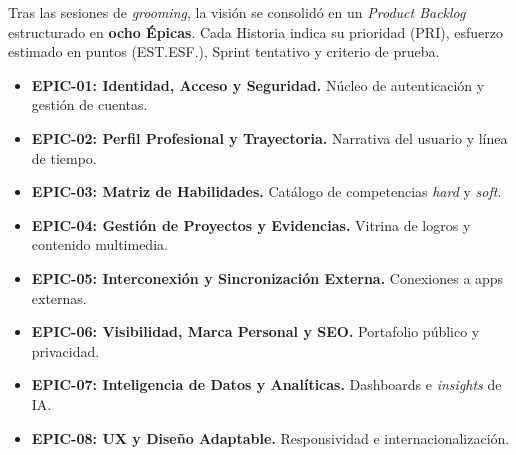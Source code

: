 Tras las sesiones de \textit{grooming}, la visión se consolidó en un \textit{Product Backlog}
estructurado en \textbf{ocho Épicas}. Cada Historia indica su prioridad (PRI), esfuerzo estimado
en puntos (EST.ESF.), Sprint tentativo y criterio de prueba.

\begin{itemize}[noitemsep]
    \item \textbf{EPIC-01: Identidad, Acceso y Seguridad.} Núcleo de autenticación y gestión de cuentas.
    \item \textbf{EPIC-02: Perfil Profesional y Trayectoria.} Narrativa del usuario y línea de tiempo.
    \item \textbf{EPIC-03: Matriz de Habilidades.} Catálogo de competencias \textit{hard} y \textit{soft}.
    \item \textbf{EPIC-04: Gestión de Proyectos y Evidencias.} Vitrina de logros y contenido multimedia.
    \item \textbf{EPIC-05: Interconexión y Sincronización Externa.} Conexiones a apps externas.
    \item \textbf{EPIC-06: Visibilidad, Marca Personal y SEO.} Portafolio público y privacidad.
    \item \textbf{EPIC-07: Inteligencia de Datos y Analíticas.} Dashboards e \textit{insights} de IA.
    \item \textbf{EPIC-08: UX y Diseño Adaptable.} Responsividad e internacionalización.
\end{itemize}

\begingroup
\footnotesize
\renewcommand{\arraystretch}{1.35}

